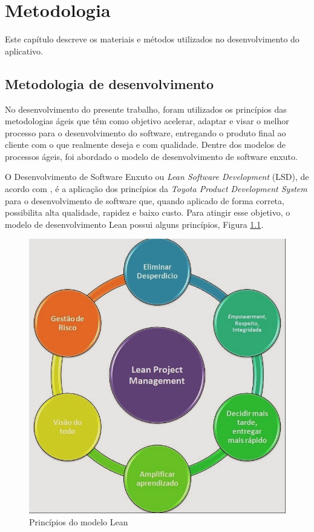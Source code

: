\chapter{Metodologia} \label{sec:metodologia}

Este capítulo descreve os materiais e métodos utilizados no desenvolvimento do aplicativo. 

\section{Metodologia de desenvolvimento} \label{sec:metodologia de desenvolvimento} 

No desenvolvimento do presente trabalho, foram utilizados os princípios das metodologias ágeis que têm como objetivo acelerar, adaptar e visar o melhor processo para o desenvolvimento do software, entregando o produto final  ao cliente com o que realmente deseja e com qualidade. Dentre dos modelos de processos ágeis, foi abordado o modelo de desenvolvimento de software enxuto.

O Desenvolvimento de Software Enxuto ou \textit{Lean Software Development} (LSD),
de acordo com \citeauthor{poppendiek2003}, é a aplicação dos princípios da \textit{Toyota Product Development System}  para o desenvolvimento de software que, quando aplicado de forma correta, possibilita alta qualidade, rapidez e baixo custo. Para atingir esse objetivo, o modelo de desenvolvimento Lean possui alguns princípios, Figura \ref{fig:principios-lean}. 


\begin{figure}[H]
	\caption{\label{fig:principios-lean}Princípios do modelo Lean}
	\centering
	\includegraphics[scale=0.3]{imagens/figura7.png}
\end{figure}

